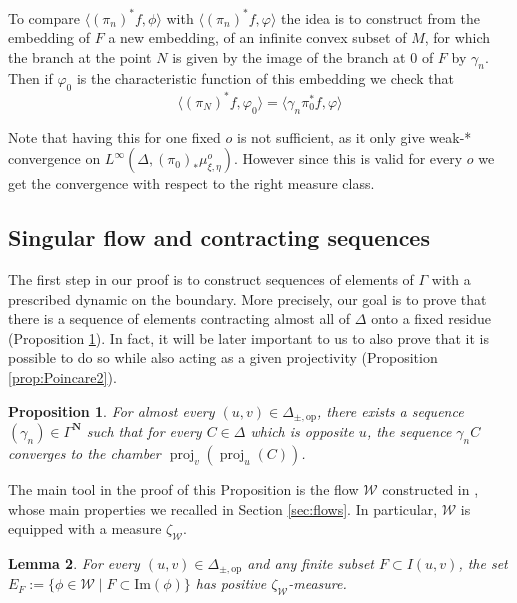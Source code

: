 \documentclass[a4paper, 11pt]{article}
\theoremstyle{plain}
\newtheorem{proposition}{Proposition}[section]
\newtheorem{lemma}[proposition]{Lemma}
\theoremstyle{definition}
\theoremstyle{remark}
\DeclareMathOperator{\proj}{proj}
\newcommand{\NN}{\mathbf{N}}                          %
\renewcommand{\Im}{\mathrm{Im}}
\newcommand{\scrW}{\mathscr W}
\newcommand{\pmop}{ {\pm,\mathrm{op}}}
\begin{document}
To compare $\langle (\pi_n)^* f,\phi \rangle$ with $\langle (\pi_n)^* f,\varphi \rangle$ the idea is to construct from the embedding of $F$ a new embedding, of an infinite convex subset of $M$, for which the branch at the point $N$ is given by the image of the branch at $0$ of $F$ by $\gamma_n$. Then if $\varphi_0$ is the characteristic function of this embedding we check that $$\langle (\pi_N)^* f,\varphi_0 \rangle=\langle \gamma_n \pi_0^*f,\varphi\rangle$$

Note that having this for one fixed $o$ is not sufficient, as it only give weak-* convergence on $L^\infty(\Delta,(\pi_0)_*\mu_{\xi,\eta}^o)$. However since this is valid for every $o$ we get the convergence with respect to the right measure class.


\subsection{Singular flow and contracting sequences}

The first step in our proof is to construct sequences of elements of $\Gamma$ with a prescribed dynamic on the boundary. More precisely, our goal is to prove that there is a sequence of elements contracting almost all of $\Delta$ onto a fixed residue (Proposition \ref{prop:Poincare}). In fact, it will be later important to us to also prove that it is possible to do so while also acting as a given projectivity (Proposition \ref{prop:Poincare2}). 

\begin{proposition}\label{prop:Poincare}
For almost every $(u,v)\in \Delta_\pmop$, there exists a sequence $(\gamma_n)\in \Gamma^\NN$ such that for  every $C\in \Delta$ which is opposite $u$, the sequence $\gamma_n C$ converges to the chamber $\proj_v(\proj_u(C))$.
\end{proposition}

The main tool in the proof of this Proposition is the flow $\scrW$ constructed in \cite{BCL}, whose main properties we recalled in Section \ref{sec:flows}. In particular, $\scrW$ is equipped with a measure $\zeta_\scrW$.

\begin{lemma}
For every $(u,v)\in \Delta_\pmop$ and any finite subset $F\subset I(u,v)$, the set $E_F:=\{\phi\in \scrW \mid F\subset \Im(\phi)\}$ has positive $\zeta_\scrW$-measure.
\end{lemma}
\end{document}
